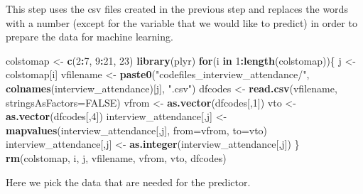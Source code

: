 \documentclass[12pt, krantz2,]{krantz}
\makeatletter
\newenvironment{Shaded}{\begin{snugshade}}{\end{snugshade}}
\newcommand{\ControlFlowTok}[1]{\textcolor[rgb]{0.27,0.27,0.27}{\textbf{#1}}}
\newcommand{\DataTypeTok}[1]{\textcolor[rgb]{0.27,0.27,0.27}{#1}}
\newcommand{\DecValTok}[1]{\textcolor[rgb]{0.06,0.06,0.06}{#1}}
\newcommand{\KeywordTok}[1]{\textcolor[rgb]{0.27,0.27,0.27}{\textbf{#1}}}
\newcommand{\NormalTok}[1]{#1}
\newcommand{\OperatorTok}[1]{\textcolor[rgb]{0.43,0.43,0.43}{\textbf{#1}}}
\newcommand{\OtherTok}[1]{\textcolor[rgb]{0.37,0.37,0.37}{#1}}
\newcommand{\StringTok}[1]{\textcolor[rgb]{0.5,0.5,0.5}{#1}}
\newenvironment{kframe}{%
\medskip{}
\setlength{\fboxsep}{.8em}
 \def\at@end@of@kframe{}%
 \ifinner\ifhmode%
  \def\at@end@of@kframe{\end{minipage}}%
  \begin{minipage}{\columnwidth}%
 \fi\fi%
 \def\FrameCommand##1{\hskip\@totalleftmargin \hskip-\fboxsep
 \colorbox{shadecolor}{##1}\hskip-\fboxsep
     \hskip-\linewidth \hskip-\@totalleftmargin \hskip\columnwidth}%
 \MakeFramed {\advance\hsize-\width
   \@totalleftmargin\z@ \linewidth\hsize
   \@setminipage}}%
 {\par\unskip\endMakeFramed%
 \at@end@of@kframe}
\renewenvironment{Shaded}{\begin{kframe}}{\end{kframe}}
\makeatother
\begin{document}
This step uses the csv files created in the previous step and replaces the words with a number (except for the variable that we would like to predict) in order to prepare the data for machine learning.

\begin{Shaded}
\begin{Highlighting}[]
\NormalTok{colstomap <-}\StringTok{ }\KeywordTok{c}\NormalTok{(}\DecValTok{2}\OperatorTok{:}\DecValTok{7}\NormalTok{, }\DecValTok{9}\OperatorTok{:}\DecValTok{21}\NormalTok{, }\DecValTok{23}\NormalTok{)}
\KeywordTok{library}\NormalTok{(plyr)}
\ControlFlowTok{for}\NormalTok{(i }\ControlFlowTok{in} \DecValTok{1}\OperatorTok{:}\KeywordTok{length}\NormalTok{(colstomap))\{}
\NormalTok{    j <-}\StringTok{ }\NormalTok{colstomap[i]}
\NormalTok{    vfilename <-}\StringTok{ }\KeywordTok{paste0}\NormalTok{(}\StringTok{"codefiles_interview_attendance/"}\NormalTok{, }\KeywordTok{colnames}\NormalTok{(interview_attendance)[j], }\StringTok{".csv"}\NormalTok{)}
\NormalTok{    dfcodes <-}\StringTok{ }\KeywordTok{read.csv}\NormalTok{(vfilename, }\DataTypeTok{stringsAsFactors=}\OtherTok{FALSE}\NormalTok{)}
\NormalTok{    vfrom <-}\StringTok{ }\KeywordTok{as.vector}\NormalTok{(dfcodes[,}\DecValTok{1}\NormalTok{])}
\NormalTok{    vto <-}\StringTok{ }\KeywordTok{as.vector}\NormalTok{(dfcodes[,}\DecValTok{4}\NormalTok{])}
\NormalTok{    interview_attendance[,j] <-}\StringTok{ }\KeywordTok{mapvalues}\NormalTok{(interview_attendance[,j], }\DataTypeTok{from=}\NormalTok{vfrom, }\DataTypeTok{to=}\NormalTok{vto)}
\NormalTok{    interview_attendance[,j] <-}\StringTok{ }\KeywordTok{as.integer}\NormalTok{(interview_attendance[,j])}
\NormalTok{\}}
\KeywordTok{rm}\NormalTok{(colstomap, i, j, vfilename, vfrom, vto, dfcodes)}
\end{Highlighting}
\end{Shaded}

Here we pick the data that are needed for the predictor.

\begin{Shaded}
\end{Shaded}
\end{document}
